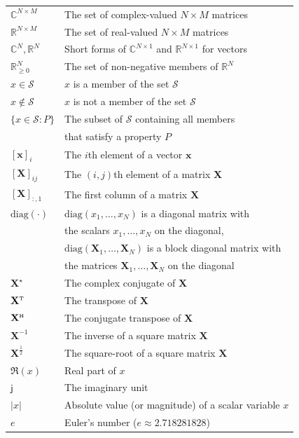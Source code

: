 \documentclass[SIG,biber]{nowfnt}
\newcommand{\vect}[1]{\mathbf{#1}}
\def\diag{\mathrm{diag}}
\def\Htran{\mbox{\tiny $\mathrm{H}$}}
\def\Ttran{\mbox{\tiny $\mathrm{T}$}}
\def\imagunit{\mathsf{j}}
\begin{document}
\begin{longtable}{ll}
   $\mathbb{C}^{N \times M}$ & The set of complex-valued $N \times M$ matrices\\
   $\mathbb{R}^{N \times M}$ & The set of real-valued $N \times M$ matrices\\
   $\mathbb{C}^{N},\mathbb{R}^{N}$ & Short forms of $\mathbb{C}^{N \times 1}$ and $\mathbb{R}^{N \times 1}$ for vectors \\
  $ \mathbb{R}_{\geq 0}^{N}$ & The set of non-negative members of $\mathbb{R}^{N}$\\
   $x \in \mathcal{S}$ & $x$ is a member of the set $\mathcal{S}$\\
   $x \not \in \mathcal{S}$ & $x$ is not a member of the set $\mathcal{S}$\\
   $\{ x \in \mathcal{S} : P \}$ & The subset of $\mathcal{S}$ containing all members \\ & that satisfy a property $P$\\
   $[\vect{x}]_i$ & The $i$th element of a vector $\vect{x}$ \\
   $[\vect{X}]_{ij}$ & The $(i,j)$th element of a matrix $\vect{X}$ \\
   $[\vect{X}]_{:,1}$ & The first column of a matrix $\vect{X}$ \\
   $\diag(\cdot)$ & $\diag(x_1,\ldots,x_N)$ is a diagonal matrix with \\ & the scalars $x_1,\ldots,x_N$ on the diagonal, \\
   &   $\diag(\vect{X}_1,\ldots,\vect{X}_N)$ is a block diagonal matrix with  \\
             &  the matrices $\vect{X}_1,\ldots,\vect{X}_N$ on the diagonal\\
   $\vect{X}^{\star}$ &  The complex conjugate of $\vect{X}$\\
   $\vect{X}^{\Ttran}$ &  The transpose of $\vect{X}$\\
   $\vect{X}^{\Htran}$ &  The conjugate transpose of $\vect{X}$\\
   $\vect{X}^{-1}$ & The inverse of a square matrix $\vect{X}$\\
   $\vect{X}^{\frac12}$ & The square-root of a square matrix $\vect{X}$\\
   $\Re(x)$ & Real part of  $x$ \\
   $\imagunit$ & The imaginary unit\\
   $|x|$   &  Absolute value (or magnitude) of a scalar variable $x$\\
   $e$ & Euler's number ($e \approx 2.718281828$) \\

\end{longtable}
\end{document}
